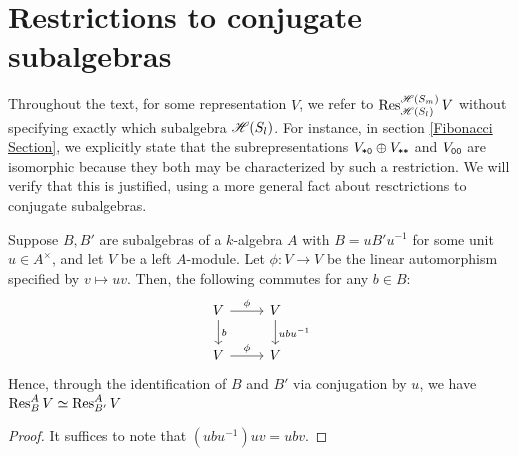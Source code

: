 \documentclass{amsart}
\begin{document}
\section{Restrictions to conjugate subalgebras}\label{Algebra}
Throughout the text, for some representation $V$, we refer to $\operatorname{Res}_{\mathscr{H}(S_{l})}^{\mathscr{H}(S_m)} V$ without specifying exactly which subalgebra $\mathscr{H}(S_{l})$.
For instance, in section \ref{Fibonacci Section}, we explicitly state that the subrepresentations $V_{\texttt{*}\texttt{0}} \oplus V_{\texttt{*}\texttt{*}}$ and $V_{\texttt{0}\texttt{0}}$ are isomorphic because they both may be characterized by such a restriction.
We will verify that this is justified, using a more general fact about resctrictions to conjugate subalgebras.
\begin{proposition}
  Suppose $B,B'$ are subalgebras of a $k$-algebra $A$ with $B = uB'u^{-1}$ for some unit $u \in A^\times$, and let $V$ be a left $A$-module.
  Let $\phi:V \rightarrow V$ be the linear automorphism specified by $v \mapsto uv$.
  Then, the following commutes for any $b \in B$:
  \[
    \begin{tikzcd}
      V \arrow[r,"\phi"] \arrow[d,"b"] & V \arrow[d,"ubu^{-1}"]\\
      V \arrow[r,"\phi"] & V
    \end{tikzcd}
  \]
  Hence, through the identification of $B$ and $B'$ via conjugation by $u$, we have $\operatorname{Res}_{B}^A V \simeq \operatorname{Res}_{B'}^A V$
\end{proposition}
\begin{proof}
  It suffices to note that $(ubu^{-1})uv = ubv$.
\end{proof}
\end{document}
